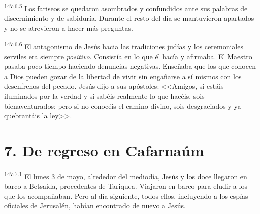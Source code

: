 \par 
\textsuperscript{147:6.5} Los fariseos se quedaron asombrados y confundidos ante sus palabras de discernimiento y de sabiduría. Durante el resto del día se mantuvieron apartados y no se atrevieron a hacer más preguntas.

\par 
\textsuperscript{147:6.6} El antagonismo de Jesús hacia las tradiciones judías y los ceremoniales serviles era siempre \textit{positivo}. Consistía en lo que él hacía y afirmaba. El Maestro pasaba poco tiempo haciendo denuncias negativas. Enseñaba que los que conocen a Dios pueden gozar de la libertad de vivir sin engañarse a sí mismos con los desenfrenos del pecado. Jesús dijo a sus apóstoles: <<Amigos, si estáis iluminados por la verdad y si sabéis realmente lo que hacéis, sois bienaventurados; pero si no conocéis el camino divino, sois desgraciados y ya quebrantáis la ley>>.

\section*{7. De regreso en Cafarnaúm}
\par 
\textsuperscript{147:7.1} El lunes 3 de mayo, alrededor del mediodía, Jesús y los doce llegaron en barco a Betsaida, procedentes de Tariquea. Viajaron en barco para eludir a los que los acompañaban. Pero al día siguiente, todos ellos, incluyendo a los espías oficiales de Jerusalén, habían encontrado de nuevo a Jesús.

